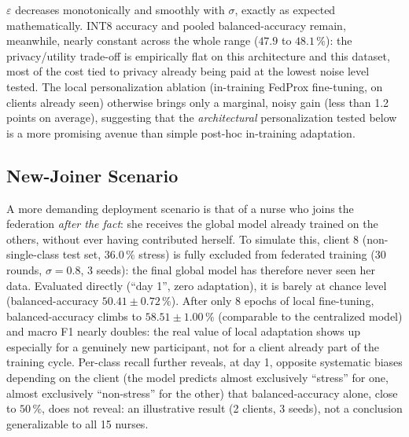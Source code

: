\documentclass{acmart}
\begin{document}
$\varepsilon$ decreases monotonically and smoothly with $\sigma$, exactly as expected
mathematically. INT8 accuracy and pooled balanced-accuracy remain, meanwhile, nearly
constant across the whole range ($47.9$ to $48.1\,\%$): the privacy/utility trade-off
is empirically flat on this architecture and this dataset, most of the cost tied to
privacy already being paid at the lowest noise level tested. The local personalization
ablation (in-training FedProx fine-tuning, on clients already seen) otherwise brings
only a marginal, noisy gain (less than 1.2 points on average), suggesting that the
\emph{architectural} personalization tested below is a more promising avenue than
simple post-hoc in-training adaptation.

\subsection{New-Joiner Scenario}

A more demanding deployment scenario is that of a nurse who joins the federation
\emph{after the fact}: she receives the global model already trained on the others,
without ever having contributed herself. To simulate this, client 8 (non-single-class
test set, $36.0\,\%$ stress) is fully excluded from federated training (30 rounds,
$\sigma=0.8$, 3 seeds): the final global model has therefore never seen her data.
Evaluated directly (``day 1'', zero adaptation), it is barely at chance level
(balanced-accuracy $50.41\pm0.72\,\%$). After only 8 epochs of local fine-tuning,
balanced-accuracy climbs to $58.51\pm1.00\,\%$ (comparable to the centralized model)
and macro F1 nearly doubles: the real value of local adaptation shows up especially
for a genuinely new participant, not for a client already part of the training cycle.
Per-class recall further reveals, at day 1, opposite systematic biases depending on
the client (the model predicts almost exclusively ``stress'' for one, almost
exclusively ``non-stress'' for the other) that balanced-accuracy alone, close to
$50\,\%$, does not reveal: an illustrative result (2 clients, 3 seeds), not a
conclusion generalizable to all 15 nurses.
\end{document}
